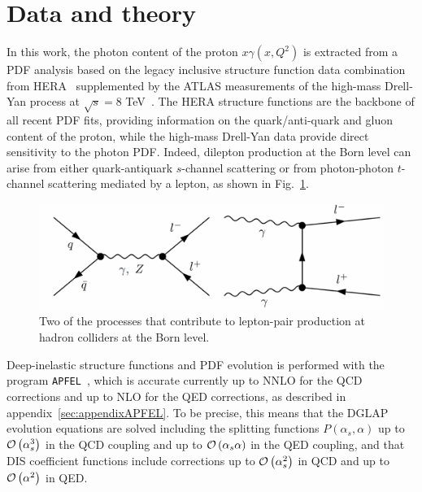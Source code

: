\section{Data and theory}
\label{sec:theory}

In this work, the photon
content of the proton $x\gamma(x,Q^2)$ is extracted from a PDF analysis based
on the legacy inclusive structure function data combination from HERA~\cite{Abramowicz:2015mha}
supplemented by the ATLAS measurements of the high-mass Drell-Yan process
at $\sqrt{s}=8$ TeV~\cite{Aad:2016zzw}.
%
The HERA structure functions are the backbone of all
recent PDF fits, providing information on the quark/anti-quark and gluon content of 
the proton, while the high-mass Drell-Yan data provide
direct sensitivity to the photon PDF.
%
Indeed, dilepton production at the Born level can arise  from either quark-antiquark $s$-channel
scattering or from photon-photon $t$-channel scattering mediated by a lepton,
as shown in Fig.~\ref{fig:photoninduced}.

\begin{figure}[t]
  \begin{center}
    \includegraphics[width=15cm]{figs/photoninduced.pdf}
    \end{center}
  \caption{Two of the processes that contribute to lepton-pair
  production at hadron colliders at the Born level.}
\label{fig:photoninduced}
\end{figure}

Deep-inelastic structure functions and PDF evolution is performed
with the program {\tt APFEL}~\cite{Bertone:2013vaa}, which is accurate currently 
up to NNLO for the QCD corrections and up to NLO for the QED corrections, as described in appendix~\ref{sec:appendixAPFEL}.
%
To be precise, this means that the DGLAP evolution equations \cite{XXXXXX} are solved including
the splitting functions $P(\alpha_s,\alpha)$ up to $\mathcal{O}\left( \alpha_s^3\right)$ in the QCD
coupling and up to $\mathcal{O}\left( \alpha_s\alpha\right)$ in the QED coupling,
and that DIS coefficient functions include corrections up to $\mathcal{O}\left( \alpha_s^2\right)$
in QCD and up to $\mathcal{O}\left( \alpha^2\right)$ in QED.

